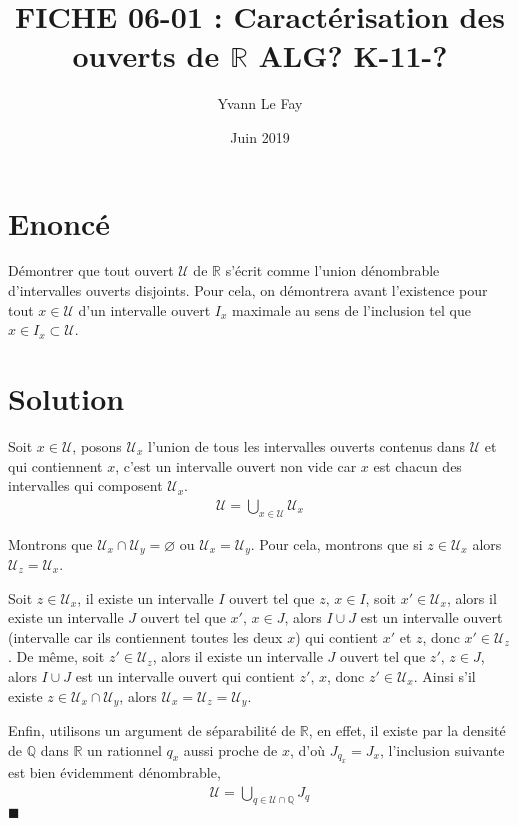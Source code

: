 \documentclass{article}
\newcommand*{\QED}{\hfill\ensuremath{\blacksquare}}%
\begin{document}
\title{FICHE 06-01 : Caractérisation des ouverts de $\mathbb{R}$ ALG? K-11-?}
\author{Yvann Le Fay}
\date{Juin 2019}
\maketitle

\section*{Enoncé}
Démontrer que tout ouvert $\mathcal{U}$ de $\mathbb{R}$ s'écrit comme l'union dénombrable d'intervalles ouverts disjoints. Pour cela, on démontrera avant l'existence pour tout $x\in \mathcal{U}$ d'un intervalle ouvert $I_x$ maximale au sens de l'inclusion tel que $x\in I_x\subset \mathcal{U}$.
\section*{Solution}
Soit $x\in \mathcal{U}$, posons $\mathcal{U}_x$ l'union de tous les intervalles ouverts contenus dans $\mathcal{U}$ et qui contiennent $x$, c'est un intervalle ouvert non vide car $x$ est chacun des intervalles qui composent $\mathcal{U}_x$.
\begin{align*}
\mathcal{U} = \bigcup_{x\in \mathcal{U}}\mathcal{U}_x
\end{align*}

Montrons que $\mathcal{U}_x\cap \mathcal{U}_y = \varnothing$ ou $\mathcal{U}_x = \mathcal{U}_y$. Pour cela, montrons que si $z\in\mathcal{U}_x$ alors $\mathcal{U}_z = \mathcal{U}_x$.

Soit $z\in\mathcal{U}_x$, il existe un intervalle $I$ ouvert tel que $z,\, x\in I$, soit $x'\in \mathcal{U}_x$, alors il existe un intervalle $J$ ouvert tel que $x',\, x\in J$, alors $I\cup J$ est un intervalle ouvert (intervalle car ils contiennent toutes les deux $x$) qui contient $x'$ et $z$, donc $x'\in \mathcal{U}_z$. De même, soit $z'\in \mathcal{U}_z$, alors il existe un intervalle $J$ ouvert tel que $z',\,z\in J$, alors $I\cup J$ est un intervalle ouvert qui contient $z',\, x$, donc $z'\in\mathcal{U}_x$. Ainsi s'il existe $z\in\mathcal{U}_x\cap \mathcal{U}_y$, alors $\mathcal{U}_x=\mathcal{U}_z=\mathcal{U}_y$. 

Enfin, utilisons un argument de séparabilité de $\mathbb{R}$, en effet, il existe par la densité de $\mathbb{Q}$ dans $\mathbb{R}$ un rationnel $q_x$ aussi proche de $x$, d'où $J_{q_x}=J_x$, l'inclusion suivante est bien évidemment dénombrable, 
\begin{align*}
\mathcal{U} = \bigcup_{q\in\mathcal{U}\cap \mathbb{Q}}J_q
\end{align*}
\QED
\end{document}
